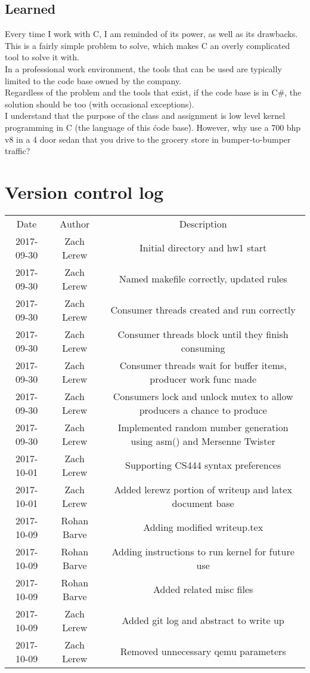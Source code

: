\documentclass[letterpaper,10pt,fleqn]{article}
\begin{document}
	\subsection*{Learned}
	Every time I work with C, I am reminded of its power, as well as its drawbacks.
	This is a fairly simple problem to solve, which makes C an overly complicated tool to solve it with.
	\\In a professional work environment, the tools that can be used are typically limited to the code base owned by the company.
	\\Regardless of the problem and the tools that exist, if the code base is in C\#, the solution should be too (with occasional exceptions).
	\\I understand that the purpose of the class and assignment is low level kernel programming in C (the language of this \'code base\').
	However, why use a 700 bhp v8 in a 4 door sedan that you drive to the grocery store in bumper-to-bumper traffic?

	\section*{Version control log}
		\begin{center}
			\begin{tabular}{ |c|c|c| }
				\hline
				Date & Author & Description \\
				2017-09-30 & Zach Lerew & Initial directory and hw1 start \\
				2017-09-30 & Zach Lerew & Named makefile correctly, updated rules \\
				2017-09-30 & Zach Lerew & Consumer threads created and run correctly \\
				2017-09-30 & Zach Lerew & Consumer threads block until they finish consuming \\
				2017-09-30 & Zach Lerew & Consumer threads wait for buffer items, producer work func made \\
				2017-09-30 & Zach Lerew & Consumers lock and unlock mutex to allow producers a chance to produce \\
				2017-09-30 & Zach Lerew & Implemented random number generation using asm() and Mersenne Twister \\
				2017-10-01 & Zach Lerew & Supporting CS444 syntax preferences \\
				2017-10-01 & Zach Lerew & Added lerewz portion of writeup and latex document base \\
				2017-10-09 & Rohan Barve & Adding modified writeup.tex \\
				2017-10-09 & Rohan Barve & Adding instructions to run kernel for future use \\
				2017-10-09 & Rohan Barve & Added related misc files \\
				2017-10-09 & Zach Lerew & Added git log and abstract to write up \\
				2017-10-09 & Zach Lerew & Removed unnecessary qemu parameters \\
				\hline
			\end{tabular}
		\end{center}
\end{document}
